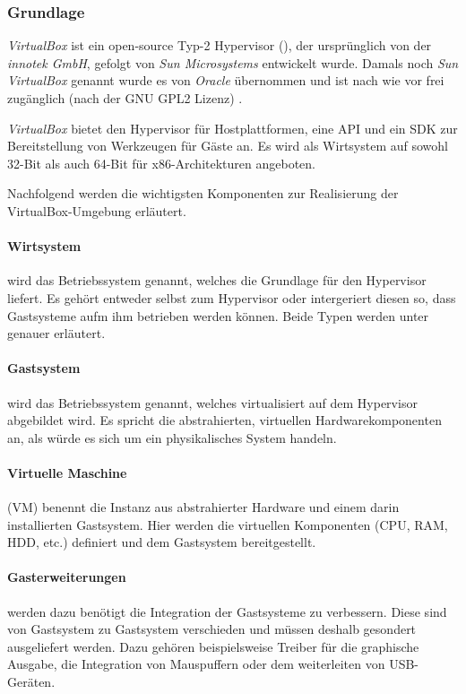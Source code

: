 \subsubsection{Grundlage}
\textit{VirtualBox} ist ein open-source Typ-2 Hypervisor (), der
ursprünglich von der \textit{innotek GmbH}, gefolgt von \textit{Sun Microsystems} entwickelt wurde.
Damals noch \textit{Sun VirtualBox} genannt wurde es von \textit{Oracle} übernommen und ist
nach wie vor frei zugänglich (nach der GNU GPL2 Lizenz) \cite{dash13}.

\textit{VirtualBox} bietet den Hypervisor für Hostplattformen, eine API und ein SDK zur
Bereitstellung von Werkzeugen für Gäste an. Es wird als Wirtsystem auf sowohl 32-Bit als auch
64-Bit für x86-Architekturen angeboten.

Nachfolgend werden die wichtigsten Komponenten zur Realisierung der VirtualBox-Umgebung
erläutert.

\paragraph{Wirtsystem} wird das Betriebssystem genannt, welches die Grundlage für den Hypervisor
liefert. Es gehört entweder selbst zum Hypervisor oder intergeriert diesen so, dass Gastsysteme
aufm ihm betrieben werden können. Beide Typen werden unter  genauer
erläutert.

\paragraph{Gastsystem} wird das Betriebssystem genannt, welches virtualisiert auf dem Hypervisor
abgebildet wird. Es spricht die abstrahierten, virtuellen Hardwarekomponenten an, als würde
es sich um ein physikalisches System handeln.

\paragraph{Virtuelle Maschine} (VM) benennt die Instanz aus abstrahierter Hardware und einem
darin installierten Gastsystem. Hier werden die virtuellen Komponenten (CPU, RAM, HDD, etc.)
definiert und dem Gastsystem bereitgestellt.

\paragraph{Gasterweiterungen} werden dazu benötigt die Integration der Gastsysteme zu verbessern.
Diese sind von Gastsystem zu Gastsystem verschieden und müssen deshalb gesondert ausgeliefert werden.
Dazu gehören beispielsweise Treiber für die graphische Ausgabe, die Integration von Mauspuffern
oder dem weiterleiten von USB-Geräten.

